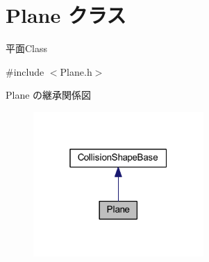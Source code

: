 \hypertarget{class_plane}{}\section{Plane クラス}
\label{class_plane}


平面\+Class  




{\ttfamily \#include $<$Plane.\+h$>$}



Plane の継承関係図\nopagebreak
\begin{figure}[H]
\begin{center}
\leavevmode
\includegraphics[width=184pt]{class_plane__inherit__graph}
\end{center}
\end{figure}
